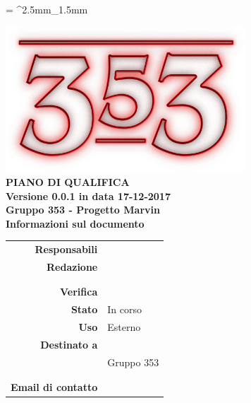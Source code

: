 \documentclass[openany, a4paper, 12pt]{report}
\begin{document}
	
	\tabulinesep = ^2.5mm_1.5mm
	
	\begin{titlepage}
		\centering
		\vfill
		{
			\bfseries
			\vskip2cm
			\includegraphics[width=9cm]{../../common/images/logo.png} \\
			\vfill
			\Huge{PIANO DI QUALIFICA}\\
			\vfill
			\Large Versione 0.0.1 in data 17-12-2017\\
			\large Gruppo 353 - Progetto Marvin\\
			\vfill
			\normalsize Informazioni sul documento\\
			\begin{table}[htbp]
				\centering
				\renewcommand\arraystretch{1.2}
				\begin{tabular}{r|l}
					\hline
					\textbf{Responsabili}	& \Parwinder \\
					\textbf{Redazione} 		& \Elena \\
											& \Gianluca \\
											& \Valentina \\
					\textbf{Verifica} 		& \\	
					
					\textbf{Stato} 			& In corso\\
					\textbf{Uso}			& Esterno\\
					\textbf{Destinato a}   	& \Proponente\\
					& Gruppo 353\\
					& \Vardanega\\
					& \Cardin\\
					
					\textbf{Email di contatto}	& \mailleaf
				\end{tabular}
			\end{table}
			\vfill
		}    
	\end{titlepage}
	
	\tableofcontents
	\listoffigures
	\listoftables
	\newpage

	
	
	
	
	
	
	
	
	
	
\end{document}
